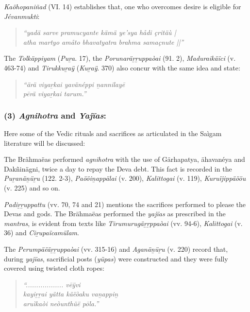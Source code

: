 \textit{Kaöhopaniñad} (VI. 14) establishes that, one who overcomes desire is eligible for \textit{Jévanmukti}:

\begin{verse}
\textit{“yadä sarve pramucyante kämä ye’sya hådi çritäù |}\\\textit{atha martyo amåto bhavatyatra brahma samaçnute ||”}
\end{verse}

The \textit{Tolkäppiyam} (\textit{Puṟa}. 17), the \textit{Porunaräṟṟuppaòai} (91. 2), \textit{Maduraikäïci} (v. 463-74) and \textit{Tirukkuṟaÿ} (\textit{Kuṟaÿ}. 370) also concur with the same idea and state:

\begin{verse}
\textit{“ärä viyaṟkai yavänéppi ṉannilayē}\\\textit{pērä viyaṟkai tarum.”}
\end{verse}



\subsubsection*{(3) \textit{Agnihotra} and \textit{Yajïas}:}

Here some of the Vedic rituals and sacrifices as articulated in the Saìgam literature will be discussed:

The Brähmaëas performed \textit{agnihotra} with the use of Gärhapatya, ähavanéya and Dakñinägni, twice a day to repay the Deva debt. This fact is recorded in the \textit{Puṟanäṉüṟu} (122. 2-3), \textit{Paööiṉappälai} (v. 200), \textit{Kalittogai} (v. 119), \textit{Kuruïjippäööu} (v. 225) and so on.

\textit{Padiṟṟuppattu} (vv. 70, 74 and 21) mentions the sacrifices performed to please the Devas and gods. The Brähmaëas performed the \textit{yajïas} as prescribed in the \textit{mantras}, is evident from texts like \textit{Tirumurugäṟṟppaòai} (vv. 94-6), \textit{Kalittogai} (v. 36) and \textit{Ciṟupaïcamülam}.

The \textit{Perumpäëäṟṟuppaòai} (vv. 315-16) and \textit{Aganäṉüṟu} (v. 220) record that, during \textit{yajïas}, sacrificial posts (\textit{yüpas}) were constructed and they were fully covered using twisted cloth ropes:

\begin{verse}
\textit{“.................. vēÿvi}\\\textit{kayiṟṟai yätta käëòaku vaṉappiṉ}\\\textit{aruìkaòi neòunthüë pōla.”}
\end{verse}

